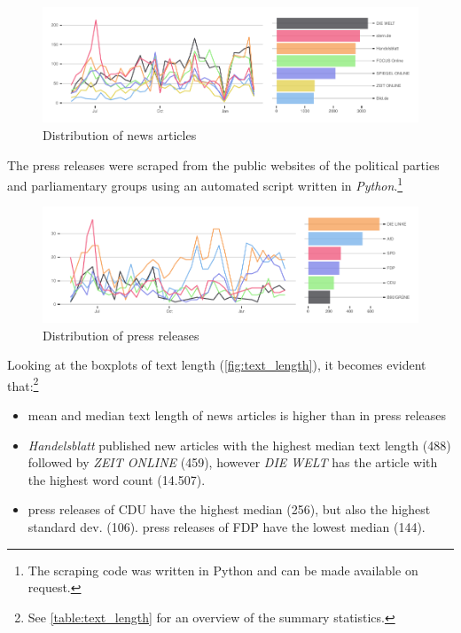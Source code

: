 \documentclass[
]{article}
\providecommand{\tightlist}{%
  \setlength{\itemsep}{0pt}\setlength{\parskip}{0pt}}
\begin{document}
\begin{figure}

{\centering \includegraphics[width=0.8\linewidth]{main_text_files/figure-latex/Distribution of news articles-1} 

}

\caption{Distribution of news articles \label{fig:news_distr}}\label{fig:Distribution of news articles}
\end{figure}

The press releases were scraped from the public websites of the
political parties and parliamentary groups using an automated script
written in \emph{Python}.\footnote{The scraping code was written in
  Python and can be made available on request.}

\begin{figure}

{\centering \includegraphics[width=0.8\linewidth]{main_text_files/figure-latex/Distribution of press releases-1} 

}

\caption{Distribution of press releases \label{fig:press_distr}}\label{fig:Distribution of press releases}
\end{figure}

Looking at the boxplots of text length (\autoref{fig:text_length}), it
becomes evident that:\footnote{See \autoref{table:text_length} for an
  overview of the summary statistics.}

\begin{itemize}
\tightlist
\item
  mean and median text length of news articles is higher than in press
  releases
\item
  \emph{Handelsblatt} published new articles with the highest median
  text length (488) followed by \emph{ZEIT ONLINE} (459), however
  \emph{DIE WELT} has the article with the highest word count (14.507).
\item
  press releases of CDU have the highest median (256), but also the
  highest standard dev. (106). press releases of FDP have the lowest
  median (144).
\end{itemize}
\end{document}

